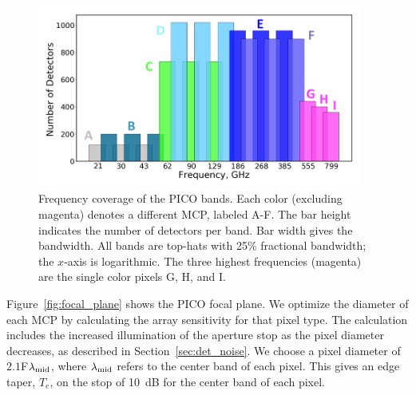 \documentclass[]{spie}  %
\begin{document}
\begin{figure} [ht]
\begin{center}
\includegraphics[height=6cm]{bands_label.png}
\end{center}
\caption { \label{fig:bands} 
Frequency coverage of the PICO bands. Each color (excluding magenta) denotes a different MCP, labeled A-F. The bar height 
indicates the number of detectors per band.  Bar width gives the bandwidth. All bands are top-hats with 
25\% fractional bandwidth; the $x$-axis is logarithmic.  The three highest frequencies (magenta) are the 
single color pixels G, H, and I.}
\end{figure} 

Figure~\ref{fig:focal_plane} shows the PICO focal plane.  
We optimize the diameter of each MCP by calculating the array sensitivity for that pixel type. The calculation includes the 
increased illumination of the aperture stop as the pixel diameter decreases, as described in Section~\ref{sec:det_noise}.
We choose a pixel diameter of $2.1$F$\lambda_{\rm mid}$, where $\lambda_{\rm mid}$ refers to the center 
band of each pixel. This gives an edge taper, $T_e$, on the stop of 10~dB for the center band of each pixel. 
\end{document}
